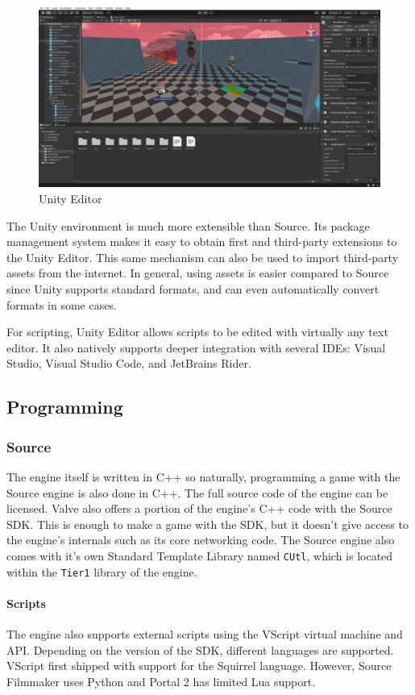 \documentclass[a4paper, 12pt]{scrartcl}
\begin{document}
\begin{figure}[!htp]
  \centering
  \includegraphics[width=\linewidth]{images/unity_editor.png}
  \caption{Unity Editor}
\end{figure}

The Unity environment is much more extensible than Source. Its package management system makes it easy to obtain first and third-party extensions to the Unity Editor. This same mechanism can also be used to import third-party assets from the internet. In general, using assets is easier compared to Source since Unity supports standard formats, and can even automatically convert formats in some cases.

For scripting, Unity Editor allows scripts to be edited with virtually any text editor. It also natively supports deeper integration with several IDEs: Visual Studio, Visual Studio Code, and JetBrains Rider.

\subsection{Programming}
\subsubsection{Source}
The engine itself is written in C++ so naturally, programming a game with the Source engine is also done in C++. The full source code of the engine can be licensed. Valve also offers a portion of the engine's C++ code with the Source SDK. This is enough to make a game with the SDK, but it doesn't give access to the engine's internals such as its core networking code. The Source engine also comes with it's own Standard Template Library named \texttt{CUtl}, which is located within the \texttt{Tier1} library of the engine.

\paragraph{Scripts}
The engine also supports external scripts using the VScript virtual machine and API. Depending on the version of the SDK, different languages are supported. VScript first shipped with support for the Squirrel language. However, Source Filmmaker uses Python and Portal 2 has limited Lua support.
\end{document}
